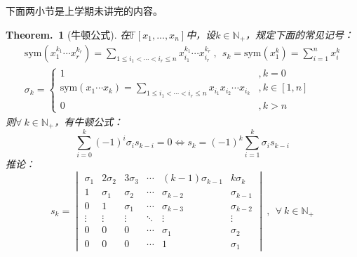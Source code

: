 \documentclass[zihao=-4,UTF8]{report}
\theoremstyle{mystyle} %
\newtheorem{theorem}{Theorem.\,}
\begin{document}
{\par\color{gray}\small
下面两小节是上学期未讲完的内容。
\par}
\begin{theorem}[牛顿公式]\label{牛顿公式}
在$\mathbb{F}[x_1,...,x_n]$中，设$k \in \mathbb{N}_+$，规定下面的常见记号：
\begin{gather*}
    \text{sym}(x_1^{k_1}\cdots x_r^{k_r}) = \sum_{1 \le i_1 < \cdots <i_r \le n }x_{i_1}^{k_1}\cdots x_{i_r}^{k_r} \ ,\ \ s_k = \text{sym}(x_1^{k}) = \sum_{i=1}^{n}x_i^k\\
    \sigma_k =\begin{cases}
        1 &, k=0\\
        \text{sym}(x_1\cdots x_k) =
        \underset{1 \le i_1 < \cdots <i_r \le n }{\sum}x_{i_1}x_{i_2}\cdots x_{i_k} &, k \in [1,n]\\
        0&, k>n 
    \end{cases}
\end{gather*}
则$\forall\ k \in \mathbb{N}_+$，有牛顿公式：
\begin{equation*}
    \sum_{i=0}^{k}(-1)^i\sigma_i s_{k-i} = 0 \Longleftrightarrow s_k = (-1)^k\sum_{i=1}^{k}\sigma_{i}s_{k-i}
\end{equation*}
推论：
\begin{equation*}
    s_k = 
    \begin{vmatrix}
        \sigma_1 & 2\sigma_2 & 3\sigma_3 & \cdots & (k-1)\sigma_{k-1} & k\sigma_{k}\\
        1 & \sigma_1 & \sigma_2  & \cdots & \sigma_{k-2} & \sigma_{k-1}\\
        0 & 1 & \sigma_1 & \cdots  & \sigma_{k-3} & \sigma_{k-2}\\
        \vdots &  \vdots &  \vdots & \ddots  &  \vdots &  \vdots\\
        0 & 0 & 0 & \cdots  & \sigma_1 & \sigma_2\\
        0 & 0 & 0 & \cdots & 1 & \sigma_1 
    \end{vmatrix}\ ,\ \ \forall\  k \in \mathbb{N}_+
\end{equation*}
\end{theorem}
\end{document}
